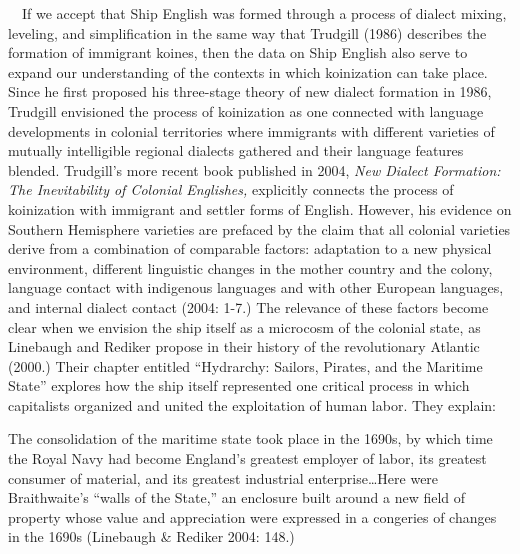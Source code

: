 \begin{styleStandard}
\ \ If we accept that Ship English was formed through a process of dialect mixing, leveling, and simplification in the same way that Trudgill (1986) describes the formation of immigrant koines, then the data on Ship English also serve to expand our understanding of the contexts in which koinization can take place. Since he first proposed his three-stage theory of new dialect formation in 1986, Trudgill envisioned the process of koinization as one connected with language developments in colonial territories where immigrants with different varieties of mutually intelligible regional dialects gathered and their language features blended. Trudgill’s more recent book published in 2004, \textit{New Dialect Formation: The Inevitability of Colonial Englishes,} explicitly connects the process of koinization with immigrant and settler forms of English. However, his evidence on Southern Hemisphere varieties are prefaced by the claim that all colonial varieties derive from a combination of comparable factors: adaptation to a new physical environment, different linguistic changes in the mother country and the colony, language contact with indigenous languages and with other European languages, and internal dialect contact (2004: 1-7.) The relevance of these factors become clear when we envision the ship itself as a microcosm of the colonial state, as Linebaugh and Rediker propose in their history of the revolutionary Atlantic (2000.) Their chapter entitled “Hydrarchy: Sailors, Pirates, and the Maritime State” explores how the ship itself represented one critical process in which capitalists organized and united the exploitation of human labor. They explain:
\end{styleStandard}

\begin{styleStandard}
The consolidation of the maritime state took place in the 1690s, by which time the Royal Navy had become England’s greatest employer of labor, its greatest consumer of material, and its greatest industrial enterprise…Here were Braithwaite’s “walls of the State,” an enclosure built around a new field of property whose value and appreciation were expressed in a congeries of changes in the 1690s (Linebaugh \& Rediker 2004: 148.)
\end{styleStandard}

